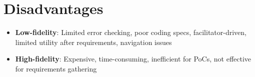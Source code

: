\documentclass{article}
\begin{document}
\section{Disadvantages}
\begin{itemize}
    \item \textbf{Low-fidelity}: Limited error checking, poor coding specs, facilitator-driven, limited utility after requirements, navigation issues
    \item \textbf{High-fidelity}: Expensive, time-consuming, inefficient for PoCs, not effective for requirements gathering
\end{itemize}
\end{document}
